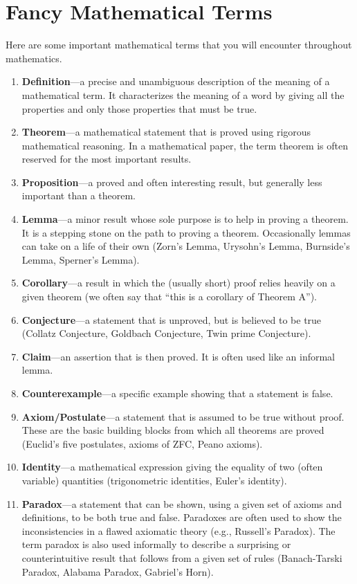 \chapter{Fancy Mathematical Terms}
\label{appendix:fancy_math_terms}

Here are some important mathematical terms that you will encounter throughout mathematics.

\begin{enumerate}
\item \textbf{Definition}---a precise and unambiguous description of the meaning of a mathematical term.  It characterizes the meaning of a word by giving all the properties and only those properties that must be true.
\item \textbf{Theorem}---a mathematical statement that is proved using rigorous mathematical reasoning.  In a mathematical paper, the term theorem is often reserved for the most important results.
\item \textbf{Proposition}---a proved and often interesting result, but generally less important than a theorem.
\item \textbf{Lemma}---a minor result whose sole purpose is to help in proving a theorem.  It is a stepping stone on the path to proving a theorem. Occasionally lemmas can take on a life of their own (Zorn's Lemma, Urysohn's Lemma, Burnside's Lemma, Sperner's Lemma).
\item \textbf{Corollary}---a result in which the (usually short) proof relies heavily on a given theorem (we often say that ``this is a corollary of Theorem A'').
\item \textbf{Conjecture}---a statement that is unproved, but is believed to be true (Collatz Conjecture, Goldbach Conjecture, Twin prime Conjecture).
\item \textbf{Claim}---an assertion that is then proved.  It is often used like an informal lemma.
\item \textbf{Counterexample}---a specific example showing that a statement is false.
\item \textbf{Axiom/Postulate}---a statement that is assumed to be true without proof. These are the basic building blocks from which all theorems are proved (Euclid's five postulates, axioms of ZFC, Peano axioms).
\item \textbf{Identity}---a mathematical expression giving the equality of two (often variable) quantities (trigonometric identities, Euler's identity).
\item \textbf{Paradox}---a statement that can be shown, using a given set of axioms and definitions, to be both true and false. Paradoxes are often used to show the inconsistencies in a flawed axiomatic theory (e.g., Russell's Paradox).  The term paradox is also used informally to describe a surprising or counterintuitive result that follows from a given set of rules (Banach-Tarski Paradox, Alabama Paradox, Gabriel's Horn).
\end{enumerate}